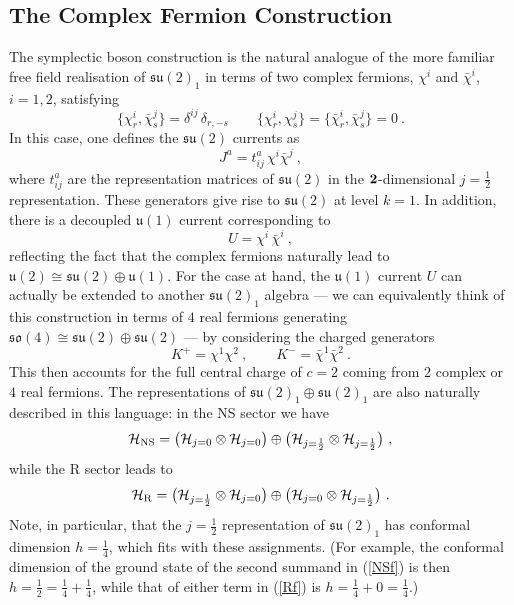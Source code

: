 \documentclass[12pt,a4paper]{article}
\newcommand{\be}{ \begin{equation}}
\newcommand{\ee}{\end{equation}}
\begin{document}
\subsection{The Complex Fermion Construction}

The symplectic boson construction is the natural analogue of the more familiar free field realisation of $\mathfrak{su}(2)_1$ in terms of two complex fermions, $\chi^i$ and $\bar{\chi}^i$, $i=1,2$, satisfying 
\be\label{ffanti}
\{\chi^i_r,\bar{\chi}^j_s\} = \delta^{ij} \, \delta_{r,-s} \qquad \{\chi^i_r,\chi^j_s\} = \{\bar{\chi}^i_r,\bar{\chi}^j_s \} = 0 \ .
\ee
In this case, one defines the $\mathfrak{su}(2)$ currents as 
\be
J^a = t^a_{ij} \, \chi^i \bar{\chi}^j \ , 
\ee
where $t^a_{ij}$ are the representation matrices of $\mathfrak{su}(2)$ in the ${\bf 2}$-dimensional $j=\frac{1}{2}$ representation. These generators give rise to $\mathfrak{su}(2)$ at level $k=1$. In addition, there is a decoupled $\mathfrak{u}(1)$ current corresponding to 
\be
U = \chi^i \, \bar{\chi}^i \ ,
\ee
reflecting the fact that the complex fermions naturally lead to $\mathfrak{u}(2) \cong \mathfrak{su}(2) \oplus \mathfrak{u}(1)$. For the case at hand, the 
$\mathfrak{u}(1)$ current $U$ can actually be extended to another $\mathfrak{su}(2)_1$ algebra --- we can equivalently think of this construction in terms of $4$ real fermions generating $\mathfrak{so}(4) \cong \mathfrak{su}(2) \oplus \mathfrak{su}(2)$ --- by considering the charged generators
\be
K^+ = \chi^1 \chi^2 \ , \qquad K^- = \bar{\chi}^1 \bar{\chi}^2 \ . 
\ee
This then accounts for the full central charge of $c=2$ coming from $2$ complex or $4$ real fermions. The representations of $\mathfrak{su}(2)_1\oplus \mathfrak{su}(2)_1$ are also naturally described in this language: in the NS sector we have 
\be\label{NSf}
{\cal H}_{{\rm NS}} = \bigl( {\cal H}_{j=0} \otimes {\cal H}_{j=0}   \bigr) \oplus \bigl( {\cal H}_{j=\frac{1}{2}} \otimes  {\cal H}_{j=\frac{1}{2}}  \bigr) \ ,
\ee
while the R sector leads to 
\be\label{Rf}
{\cal H}_{{\rm R}}  =  \bigl( {\cal H}_{j=\frac{1}{2}} \otimes {\cal H}_{j=0}   \bigr) \oplus  \bigl( {\cal H}_{j=0} \otimes {\cal H}_{j=\frac{1}{2}}   \bigr)  \ .
\ee
Note, in particular, that the $j=\frac{1}{2}$ representation of $\mathfrak{su}(2)_1$ has conformal dimension $h=\frac{1}{4}$, which fits with these assignments. (For example, the conformal dimension of the ground state of the second summand in (\ref{NSf}) is then $h=\frac{1}{2} = \frac{1}{4} + \frac{1}{4}$, while that of either term in (\ref{Rf}) is $h=\frac{1}{4}+0 = \frac{1}{4}$.)
\end{document}
